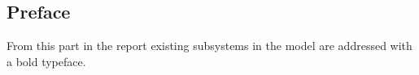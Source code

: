 \subsection{Preface}

From this part in the report existing subsystems in the model are addressed with a bold typeface.  
